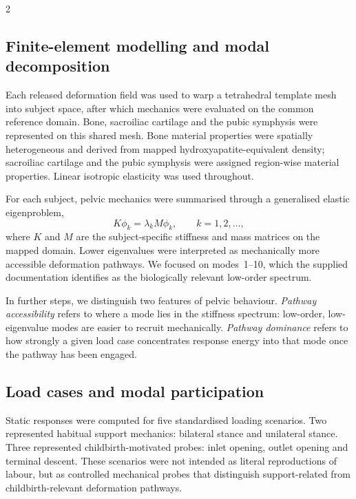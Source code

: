 \documentclass[openacc]{rsproca_new}
\begin{document}
\begin{multicols}{2}
\subsection{Finite-element modelling and modal decomposition}

Each released deformation field was used to warp a tetrahedral template mesh into subject space, after which mechanics were evaluated on the common reference domain. Bone, sacroiliac cartilage and the pubic symphysis were represented on this shared mesh. Bone material properties were spatially heterogeneous and derived from mapped hydroxyapatite-equivalent density; sacroiliac cartilage and the pubic symphysis were assigned region-wise material properties. Linear isotropic elasticity was used throughout.

For each subject, pelvic mechanics were summarised through a generalised elastic eigenproblem,
\begin{equation}
K\phi_{k} = \lambda_{k} M\phi_{k}, \qquad k=1,2,\ldots,
\end{equation}
where $K$ and $M$ are the subject-specific stiffness and mass matrices on the mapped domain. Lower eigenvalues were interpreted as mechanically more accessible deformation pathways. We focused on modes~1--10, which the supplied documentation identifies as the biologically relevant low-order spectrum.

In further steps, we distinguish two features of pelvic behaviour. \emph{Pathway accessibility} refers to where a mode lies in the stiffness spectrum: low-order, low-eigenvalue modes are easier to recruit mechanically. \emph{Pathway dominance} refers to how strongly a given load case concentrates response energy into that mode once the pathway has been engaged.

\subsection{Load cases and modal participation}

Static responses were computed for five standardised loading scenarios. Two represented habitual support mechanics: bilateral stance and unilateral stance. Three represented childbirth-motivated probes: inlet opening, outlet opening and terminal descent. These scenarios were not intended as literal reproductions of labour, but as controlled mechanical probes that distinguish support-related from childbirth-relevant deformation pathways.


\end{multicols}
\end{document}
